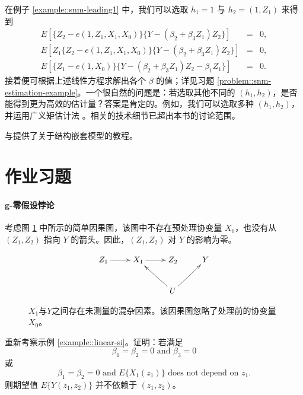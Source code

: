 \begin{example}
\label{example::g-estimation-snm}
在例子 \ref{example::snm-leading1} 中，我们可以选取 $h_1 = 1$ 与 $h_2 = (1,Z_1)$ 来得到
\begin{eqnarray*}
 E\left[    \{ Z_2 - e(1, Z_1, X_1, X_0)  \}  \{Y-  (\beta_2 + \beta_3 Z_1  ) Z_2\}   \right] &=& 0,
\\
 E\left[   Z_1 \{ Z_2 - e(1, Z_1, X_1, X_0)  \}  \{Y-  (\beta_2 + \beta_3 Z_1  ) Z_2\}   \right] &=& 0,
 \\
 E\left[    \{  Z_1 - e(1, X_0) \}  \{Y- (\beta_2 + \beta_3 Z_1  ) Z_2 - \beta_1  Z_1 \}  \right] &=& 0 . 
 \end{eqnarray*}
接着便可根据上述线性方程求解出各个 $\beta$ 的值；详见习题 \ref{problem::snm-estimation-example}。一个很自然的问题是：若选取其他不同的 $(h_1, h_2)$，是否能得到更为高效的估计量？答案是肯定的。例如，我们可以选取多种 $(h_1, h_2)$，并运用广义矩估计法 \citep{hansen1982large}。相关的技术细节已超出本书的讨论范围。  
\end{example}

 
\citet{naimi2017introduction}与\citet{vansteelandt2014structural}提供了关于结构嵌套模型的教程。 
 
  
  
\section{作业习题}

\paragraph{g-零假设悖论}\label{problem::g-null-paradox}


考虑图 \ref{fig::si-g-null-paradox} 中所示的简单因果图，该图中不存在预处理协变量 $X_0$，也没有从 $(Z_1, Z_2)$ 指向 $Y$ 的箭头。因此，$(Z_1,Z_2)$ 对 $Y$ 的影响为零。

\begin{figure}
\bigskip 
$$
 \xymatrix{
 Z_1 \ar[r]   & X_1   \ar[r]  & Z_2  & Y \\
                                             &                                             &U\ar[lu]\ar[ru]
 }
 $$
 \caption{$X_1$与$Y$之间存在未测量的混杂因素。该因果图忽略了处理前的协变量$X_0$。}\label{fig::si-g-null-paradox}
\end{figure}


重新考察示例 \ref{example::linear-si}。证明：若满足 $$
\beta_1  = \beta_2 = 0  \text{ and }   \beta_3 = 0
$$ 或 $$
\beta_1 = \beta_2 = 0 \text{ and } E\{ X_1(z_1)\}  \text{ does not depend on } z_1.
$$则期望值 $E\{ Y(z_1, z_2) \} $ 并不依赖于 $(z_1, z_2)$。 



